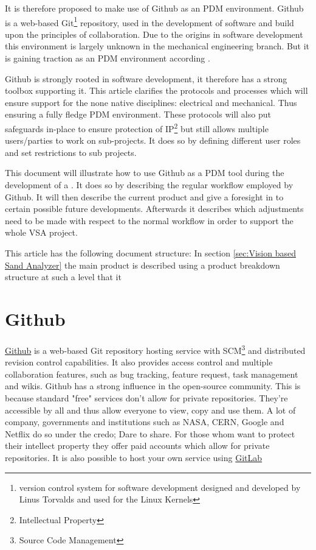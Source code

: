 \documentclass[fleqn,10pt]{SelfArx} %
\begin{document}
It is therefore proposed to make use of Github as an PDM environment. Github is a web-based Git\footnote{version control system for software development designed and developed by Linus Torvalds and used for the Linux Kernels} repository, used in the development of software and build upon the principles of collaboration. Due to the origins in software development this environment is largely unknown in the mechanical engineering branch. But it is gaining traction as an PDM environment according \citeauthor{oleg_github_2013}\cite{oleg_github_2013}. 

Github is strongly rooted in software development, it therefore has a strong toolbox supporting it. This article clarifies the protocols and processes which will ensure support for the none native disciplines: electrical and mechanical. Thus ensuring a fully fledge PDM environment. These protocols will also put safeguards in-place to ensure protection of IP\footnote{Intellectual Property} but still allows multiple users/parties to work on sub-projects. It does so by defining different user roles and set restrictions to sub projects.

This document will illustrate how to use Github as a PDM tool during the development of a \vsa . It does so by describing the regular workflow employed by Github. It will then describe the current product and give a foresight in to certain possible future developments. Afterwards it describes which adjustments need to be made with respect to the normal workflow in order to support the whole VSA project.

This article has the following document structure: In section \ref{sec:Vision based Sand Analyzer} the main product is described using a product breakdown structure at such a level that it

\section{Github}\label{sec:Github}
\href{https://github.com/}{\color{color1}Github} is a web-based Git repository hosting service with SCM\footnote{Source Code Management} and distributed revision control capabilities. It also provides access control and multiple collaboration features, such as bug tracking, feature request, task management and wikis. Github has a strong influence in the open-source community. This is because standard "free" services don't allow for private repositories. They're accessible by all and thus allow everyone to view, copy and use them. A lot of company, governments and institutions such as NASA, CERN, Google and Netflix do so under the credo; Dare to share. 
For those whom want to protect their intellect property they offer paid accounts which allow for private repositories. It is also possible to host your own service using \href{https://about.gitlab.com/}{\color{color1}GitLab} 
\end{document}
